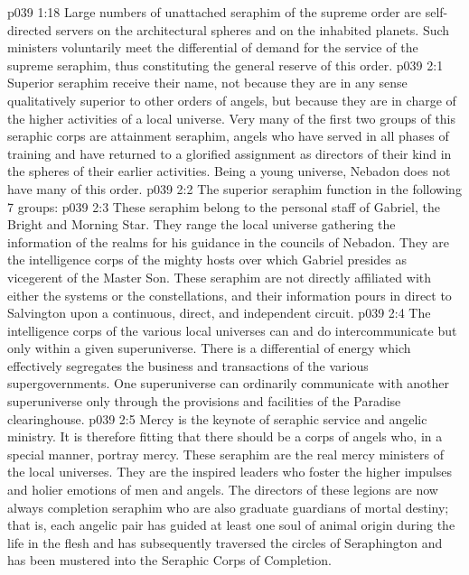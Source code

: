 \vs p039 1:18 \bibnobreakspace {} Large numbers of unattached seraphim of the supreme order are self\hyp{}directed servers on the architectural spheres and on the inhabited planets. Such ministers voluntarily meet the differential of demand for the service of the supreme seraphim, thus constituting the general reserve of this order.
\vs p039 2:1 Superior seraphim receive their name, not because they are in any sense qualitatively superior to other orders of angels, but because they are in charge of the higher activities of a local universe. Very many of the first two groups of this seraphic corps are attainment seraphim, angels who have served in all phases of training and have returned to a glorified assignment as directors of their kind in the spheres of their earlier activities. Being a young universe, Nebadon does not have many of this order.
\vs p039 2:2 The superior seraphim function in the following 7 groups:
\vs p039 2:3 \bibnobreakspace {} These seraphim belong to the personal staff of Gabriel, the Bright and Morning Star. They range the local universe gathering the information of the realms for his guidance in the councils of Nebadon. They are the intelligence corps of the mighty hosts over which Gabriel presides as vicegerent of the Master Son. These seraphim are not directly affiliated with either the systems or the constellations, and their information pours in direct to Salvington upon a continuous, direct, and independent circuit.
\vs p039 2:4 The intelligence corps of the various local universes can and do intercommunicate but only within a given superuniverse. There is a differential of energy which effectively segregates the business and transactions of the various supergovernments. One superuniverse can ordinarily communicate with another superuniverse only through the provisions and facilities of the Paradise clearinghouse.
\vs p039 2:5 \bibnobreakspace {} Mercy is the keynote of seraphic service and angelic ministry. It is therefore fitting that there should be a corps of angels who, in a special manner, portray mercy. These seraphim are the real mercy ministers of the local universes. They are the inspired leaders who foster the higher impulses and holier emotions of men and angels. The directors of these legions are now always completion seraphim who are also graduate guardians of mortal destiny; that is, each angelic pair has guided at least one soul of animal origin during the life in the flesh and has subsequently traversed the circles of Seraphington and has been mustered into the Seraphic Corps of Completion.
